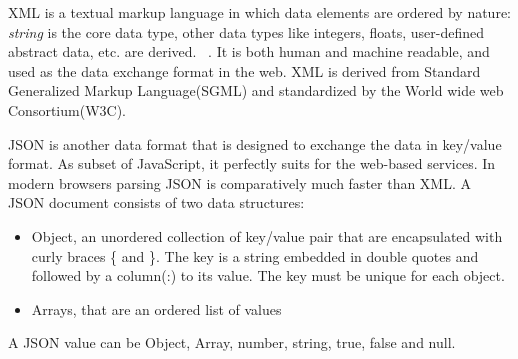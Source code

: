 XML is a textual markup language in which data elements are ordered by nature: \textit{string} is the core data type, other data types like integers, floats, user-defined abstract data, etc. are derived. ~\citep{xmark/original}. It is both human and machine readable, and  used as the data exchange format in the web. XML is derived from Standard Generalized Markup Language(SGML) and standardized by the World wide web Consortium(W3C).
\par
    JSON is another data format that is designed to exchange the data in key/value format. As subset of JavaScript, it perfectly suits for the web-based services. In modern browsers parsing JSON is comparatively much faster than XML. A JSON document consists of two data structures:
\begin{itemize}
	\item Object, an unordered collection of key/value pair that are encapsulated with curly braces \{ and \}. The key is a string embedded in double quotes and followed by a column(:) to its value. The key must be unique for each object.
	\item Arrays, that are an ordered list of values
\end{itemize}
A JSON value can be Object, Array, number, string, true, false and null.
  
